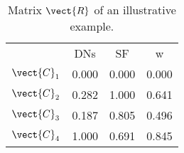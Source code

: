 \begin{table}
\centering
\begin{tabular}{cccc}
 & DNs & SF & w \\
$\vect{C}_1$ & 0.000 & 0.000 & 0.000 \\
$\vect{C}_2$ & 0.282 & 1.000 & 0.641 \\
$\vect{C}_3$ & 0.187 & 0.805 & 0.496 \\
$\vect{C}_4$ & 1.000 & 0.691 & 0.845 \\
\end{tabular}
\caption{Matrix $\vect{R}$ of an illustrative example.}
\label{table:tab:example:R}
\end{table}
